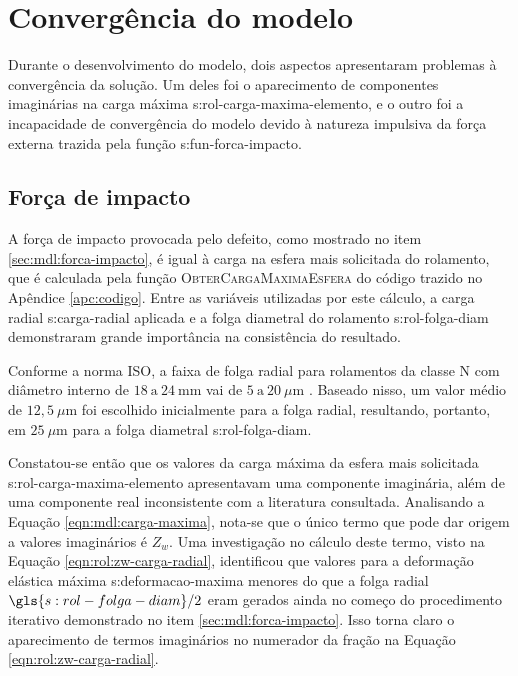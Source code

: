 \documentclass[12pt,oneside,english,brazil,lmodern,siglas,simbolos,cite=num]{ucsmonograph}
\begin{document}
	\section{Convergência do modelo}
	Durante o desenvolvimento do modelo, dois aspectos apresentaram problemas à convergência da solução.
	Um deles foi o aparecimento de componentes imaginárias na carga máxima \gls{s:rol-carga-maxima-elemento}, e o outro foi a incapacidade de convergência do modelo devido à natureza impulsiva da força externa trazida pela função \gls{s:fun-forca-impacto}.
	
	\subsection{Força de impacto}
	A força de impacto provocada pelo defeito, como mostrado no item \ref{sec:mdl:forca-impacto}, é igual à carga na esfera mais solicitada do rolamento, que é calculada pela função \textsc{ObterCargaMaximaEsfera} do código trazido no Apêndice \ref{apc:codigo}.
	Entre as variáveis utilizadas por este cálculo, a carga radial \gls{s:carga-radial} aplicada e a folga diametral do rolamento \gls{s:rol-folga-diam} demonstraram grande importância na consistência do resultado.
	
	Conforme a norma ISO, a faixa de folga radial para rolamentos da classe N com diâmetro interno de $18\ \text{a}\ 24\ \text{mm}$ vai de $5\ \text{a}\ 20\ \mu\text{m}$ \cite{skf6004}.
	Baseado nisso, um valor médio de $12,5\ \mu\text{m}$ foi escolhido inicialmente para a folga radial, resultando, portanto, em $25\ \mu\text{m}$ para a folga diametral \gls{s:rol-folga-diam}.
	
	Constatou-se então que os valores da carga máxima da esfera mais solicitada \gls{s:rol-carga-maxima-elemento} apresentavam uma componente imaginária, além de uma componente real inconsistente com a literatura consultada.
	Analisando a Equação \ref{eqn:mdl:carga-maxima}, nota-se que o único termo que pode dar origem a valores imaginários é $Z_w$.
	Uma investigação no cálculo deste termo, visto na Equação \ref{eqn:rol:zw-carga-radial}, identificou que valores para a deformação elástica máxima \gls{s:deformacao-maxima} menores do que a folga radial $\gls{s:rol-folga-diam}/2$ eram gerados ainda no começo do procedimento iterativo demonstrado no item \ref{sec:mdl:forca-impacto}.
	Isso torna claro o aparecimento de termos imaginários no numerador da fração na Equação \ref{eqn:rol:zw-carga-radial}.
	
\end{document}
